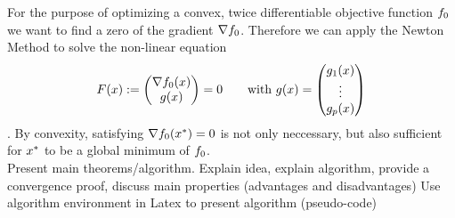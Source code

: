 
For the purpose of optimizing a convex, twice differentiable objective function $ f_0 $ we want to find a zero of the gradient $ \nabla f_0 $. Therefore we can apply the Newton Method to solve the non-linear equation \[ F(x) := \begin{pmatrix} {\nabla f_0(x)} \\ {g(x)} \end{pmatrix} = 0 \qquad \text{with }  g(x) = \begin{pmatrix} {g_1(x)} \\ {\vdots} \\ {g_p(x)} \end{pmatrix} \]. By convexity, satisfying $ \nabla f_0 (x^*) = 0$ is not only neccessary, but also sufficient for $ x^* $ to be a global minimum of $ f_0 $.\\




Present main theorems/algorithm. Explain idea, explain algorithm, 
provide a convergence proof, discuss main properties (advantages and disadvantages)
%	
Use algorithm environment in Latex to present algorithm (pseudo-code)
